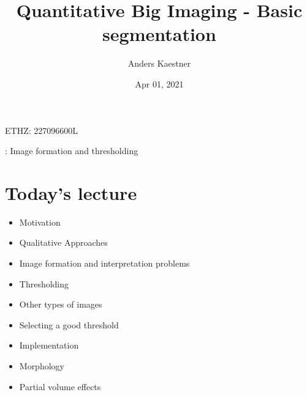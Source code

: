\documentclass[letterpaper,10pt,english]{sphinxmanual}
\title{Quantitative Big Imaging - Basic segmentation}
\date{Apr 01, 2021}
\author{Anders Kaestner}
\begin{document}
\pagestyle{empty}
\sphinxmaketitle
\pagestyle{plain}
\sphinxtableofcontents
\pagestyle{normal}
\label{\detokenize{04-BasicSegmentation::doc}}




\sphinxAtStartPar
{} ETHZ: 227\sphinxhyphen{}0966\sphinxhyphen{}00L

\sphinxAtStartPar
{}: Image formation and thresholding






\chapter{Today’s lecture}
\label{\detokenize{04-BasicSegmentation:today-s-lecture}}\begin{itemize}
\item {} 
\sphinxAtStartPar
Motivation

\item {} 
\sphinxAtStartPar
Qualitative Approaches

\item {} 
\sphinxAtStartPar
Image formation and interpretation problems

\item {} 
\sphinxAtStartPar
Thresholding

\item {} 
\sphinxAtStartPar
Other types of images

\item {} 
\sphinxAtStartPar
Selecting a good threshold

\item {} 
\sphinxAtStartPar
Implementation

\item {} 
\sphinxAtStartPar
Morphology

\item {} 
\sphinxAtStartPar
Partial volume effects

\end{itemize}
\end{document}
